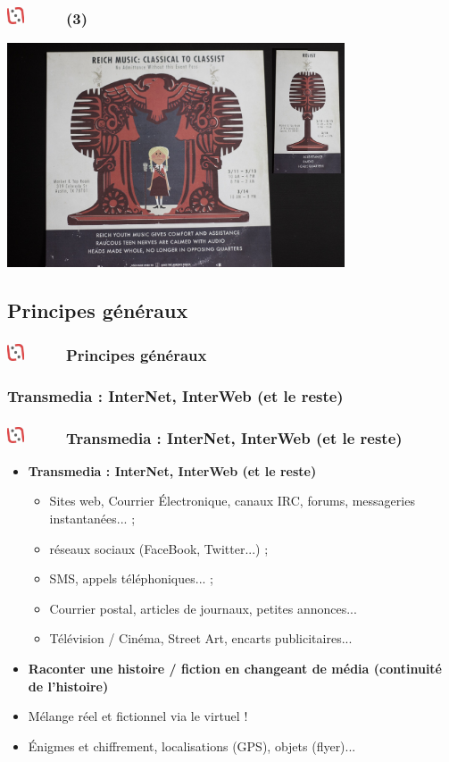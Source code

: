 \documentclass[slidetop,11pt]{beamer}
\def\moreInFrameTitleLeftt{\includegraphics[height=0.5cm]{img/ligueludique-0.png}~~~~~}
\begin{document}
\begin{frame}
	\frametitle{\moreInFrameTitleLeftt \sectionPartIIaVIII  (3) }
	\includegraphics[width=10.00cm]{img/ResistanceRadio/resistance-radio-secret-solved.jpg}~\\
\end{frame}



\def\sectionPartIIb{Principes g{\'e}n{\'e}raux}
\subsection{\sectionPartIIb} %
\begin{frame}
	\frametitle{\moreInFrameTitleLeftt \sectionPartIIb }
	\tableofcontents[sections=2,currentsection,subsectionstyle=show/shaded/hide]
\end{frame} 

\def\sectionPartIIbI{Transmedia : InterNet, InterWeb (et le reste)}
\subsubsection{\sectionPartIIbI} %
\begin{frame}
	\frametitle{\moreInFrameTitleLeftt \sectionPartIIbI }
	\begin{itemize}
		\item \textbf{ \sectionPartIIbI }
		\begin{itemize}
			\item Sites web, Courrier {\'E}lectronique, canaux IRC, forums, messageries instantan{\'e}es... ; 
			\item r{\'e}seaux sociaux (FaceBook, Twitter...) ; 
			\item SMS, appels t{\'e}l{\'e}phoniques... ; 
			\item Courrier postal, articles de journaux, petites annonces...
			\item T{\'e}l{\'e}vision / Cin{\'e}ma, Street Art, encarts publicitaires...
		\end{itemize}
		\item \textbf{Raconter une histoire / fiction en changeant de m{\'e}dia (continuit{\'e} de l'histoire)}
		\item M{\'e}lange r{\'e}el et fictionnel via le virtuel !
		\item {\'E}nigmes et chiffrement, localisations (GPS), objets (flyer)...
	\end{itemize}
\end{frame} 
\end{document}
